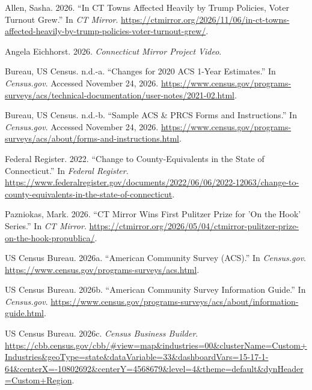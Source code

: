 \documentclass[
  letterpaper,
  DIV=11,
  numbers=noendperiod]{scrartcl}
\newlength{\cslhangindent}
\newenvironment{CSLReferences}[2] %
 {\begin{list}{}{%
  \setlength{\itemindent}{0pt}
  \setlength{\leftmargin}{0pt}
  \setlength{\parsep}{0pt}
  \ifodd #1
   \setlength{\leftmargin}{\cslhangindent}
   \setlength{\itemindent}{-1\cslhangindent}
  \fi
  \setlength{\itemsep}{#2\baselineskip}}}
 {\end{list}}
\begin{document}
\protect{}\label{refs}
\begin{CSLReferences}{1}{1}
Allen, Sasha. 2026. {``In {CT} Towns Affected Heavily by {Trump}
Policies, Voter Turnout Grew.''} In \emph{CT Mirror}.
\url{https://ctmirror.org/2026/11/06/in-ct-towns-affected-heavily-by-trump-policies-voter-turnout-grew/}.

Angela Eichhorst. 2026. \emph{Connecticut {Mirror} {Project} {Video}}.

Bureau, US Census. n.d.-a. {``Changes for 2020 {ACS} 1-{Year}
{Estimates}.''} In \emph{Census.gov}. Accessed November 24, 2026.
\url{https://www.census.gov/programs-surveys/acs/technical-documentation/user-notes/2021-02.html}.

Bureau, US Census. n.d.-b. {``Sample {ACS} \& {PRCS} {Forms} and
{Instructions}.''} In \emph{Census.gov}. Accessed November 24, 2026.
\url{https://www.census.gov/programs-surveys/acs/about/forms-and-instructions.html}.

Federal Register. 2022. {``Change to {County}-{Equivalents} in the
{State} of {Connecticut}.''} In \emph{Federal Register}.
\url{https://www.federalregister.gov/documents/2022/06/06/2022-12063/change-to-county-equivalents-in-the-state-of-connecticut}.

Pazniokas, Mark. 2026. {``{CT} {Mirror} Wins First {Pulitzer} {Prize}
for '{On} the {Hook}' Series.''} In \emph{CT Mirror}.
\url{https://ctmirror.org/2026/05/04/ctmirror-pulitzer-prize-on-the-hook-propublica/}.

US Census Bureau. 2026a. {``American {Community} {Survey} ({ACS}).''} In
\emph{Census.gov}.
\url{https://www.census.gov/programs-surveys/acs.html}.

US Census Bureau. 2026b. {``American {Community} {Survey} {Information}
{Guide}.''} In \emph{Census.gov}.
\url{https://www.census.gov/programs-surveys/acs/about/information-guide.html}.

US Census Bureau. 2026c. \emph{Census {Business} {Builder}}.
\url{https://cbb.census.gov/cbb/\#view=map&industries=00&clusterName=Custom+Industries&geoType=state&dataVariable=33&dashboardVars=15-17-1-64&centerX=-10802692&centerY=4568679&level=4&theme=default&dynHeader=Custom+Region}.

\end{CSLReferences}
\end{document}
